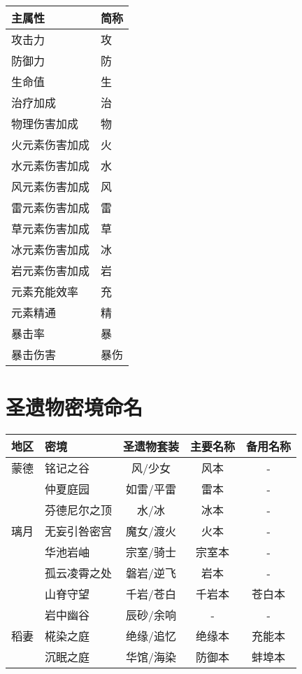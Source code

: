 \begin{longtabu} {|X[c]|X[c]|}
	\hline
	{主属性}         & {简称} \\
	\hline
	\endhead
	\hline
	\endfoot
	{攻击力}         & {攻}   \\
	{防御力}         & {防}   \\
	{生命值}         & {生}   \\
	{治疗加成}         & {治}   \\
	{物理伤害加成}   & {物}   \\
	{火元素伤害加成} & {火}   \\
	{水元素伤害加成} & {水}   \\
	{风元素伤害加成} & {风}   \\
	{雷元素伤害加成} & {雷}   \\
	{草元素伤害加成} & {草}   \\
	{冰元素伤害加成} & {冰}   \\
	{岩元素伤害加成} & {岩}   \\
	\hline
	{元素充能效率}   & {充}   \\
	{元素精通}       & {精}   \\
	\hline
	{暴击率}         & {暴}   \\
	{暴击伤害}       & {暴伤} \\
\end{longtabu}




\section{圣遗物密境命名}

\noindent\begin{tabu}{|c|X[c]|c|c|c|}
	\hline
	{地区} & {密境}         & {圣遗物套装} & {主要名称} & {备用名称} \\
	\hline
	{蒙德} & {铭记之谷}     & {风/少女}    & {风本}     & {-}        \\
	{ }    & {仲夏庭园}     & {如雷/平雷}  & {雷本}     & {-}        \\
	{ }    & {芬德尼尔之顶} & {水/冰}      & {冰本}     & {-}        \\
	\hline
	{璃月} & {无妄引咎密宫} & {魔女/渡火}  & {火本}     & {-}        \\
	{ }    & {华池岩岫}     & {宗室/骑士}  & {宗室本}   & {-}        \\
	{ }    & {孤云凌霄之处} & {磐岩/逆飞}  & {岩本}     & {-}        \\
	{ }    & {山脊守望}     & {千岩/苍白}  & {千岩本}   & {苍白本}   \\
	{ }    & {岩中幽谷}     & {辰砂/余响}  & {-}        & {-}        \\
	\hline
	{稻妻} & {椛染之庭}     & {绝缘/追忆}  & {绝缘本}   & {充能本}   \\
	{ }    & {沉眠之庭}     & {华馆/海染}  & {防御本}   & {蚌埠本}   \\
	\hline
\end{tabu}




